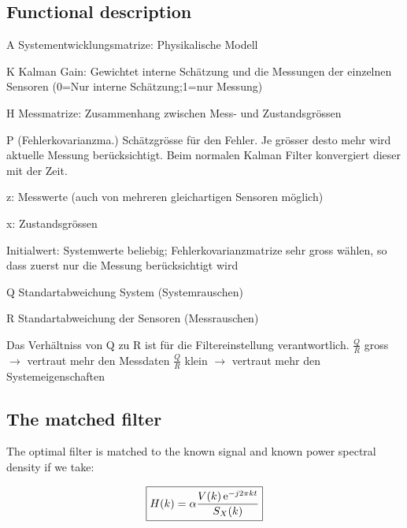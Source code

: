 \subsection{Functional description}
		\begin{liste}
	    	\item A Systementwicklungsmatrize: Physikalische Modell
	    	\item K Kalman Gain: Gewichtet interne Schätzung und die Messungen der
	    	einzelnen Sensoren (0=Nur interne Schätzung;1=nur Messung)
	    	\item H Messmatrize: Zusammenhang zwischen Mess- und Zustandsgrössen
	    	\item P (Fehlerkovarianzma.) Schätzgrösse für den Fehler. Je grösser desto
	    	mehr wird aktuelle Messung berücksichtigt. Beim normalen Kalman Filter
	    	konvergiert dieser mit der Zeit.
	    	\item z: Messwerte (auch von mehreren gleichartigen Sensoren möglich)
	    	\item x: Zustandsgrössen
	    	\item Initialwert: Systemwerte beliebig; Fehlerkovarianzmatrize sehr
	    	gross wählen, so dass zuerst nur die Messung berücksichtigt wird
	    	\item Q Standartabweichung System (Systemrauschen)
	    	\item R Standartabweichung der Sensoren (Messrauschen)
				\item Das Verhältniss von Q zu R ist für die Filtereinstellung verantwortlich.\newline
				$\frac QR$ gross $\rightarrow$ vertraut mehr den Messdaten\newline \hspace{4cm} $\frac QR$ klein $\rightarrow$ vertraut mehr den Systemeigenschaften
	    \end{liste}

\subsection{The matched filter }

The optimal filter is matched to the known signal and known power spectral density if we take:

$$\boxed{H(k)=\alpha\frac{V(k)\operatorname{\mathrm e}^{-j2\pi k t}}{S_X(k)}}$$


